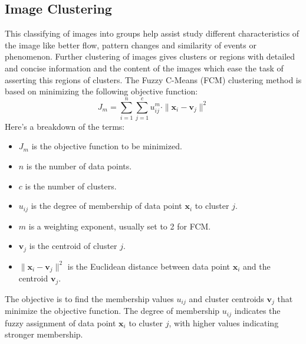 \documentclass[12pt,a4paper,IEEEtran]{article}
\begin{document}
\subsection[4.1]{Image Clustering}
This classifying of images into groups help assist study different characteristics of the image like better flow, pattern changes and similarity of events or phenomenon. Further clustering of images gives clusters or regions with detailed and concise information and the content of the images which ease the task of asserting this regions of clusters. 
\newpage The Fuzzy C-Means (FCM) clustering method \cite{BEZDEK1984191} is based on minimizing the following objective function:
\begin{equation}
J_m = \sum_{i=1}^{n} \sum_{j=1}^{c} u_{ij}^m \cdot \|\mathbf{x}_i - \mathbf{v}_j\|^2
\end{equation}
\newline Here's a breakdown of the terms:
\begin{itemize}
    \item $J_m$ is the objective function to be minimized.
    \item $n$ is the number of data points.
    \item $c$ is the number of clusters.
    \item $u_{ij}$ is the degree of membership of data point $\mathbf{x}_i$ to cluster $j$.
    \item $m$ is a weighting exponent, usually set to 2 for FCM.
    \item $\mathbf{v}_j$ is the centroid of cluster $j$.
    \item $\|\mathbf{x}_i - \mathbf{v}_j\|^2$ is the Euclidean distance between data point $\mathbf{x}_i$ and the centroid $\mathbf{v}_j$.
\end{itemize}

The objective is to find the membership values \( u_{ij} \) and cluster centroids \( \mathbf{v}_j \) that minimize the objective function. The degree of membership \( u_{ij} \) indicates the fuzzy assignment of data point \( \mathbf{x}_i \) to cluster \( j \), with higher values indicating stronger membership.


\end{document}
